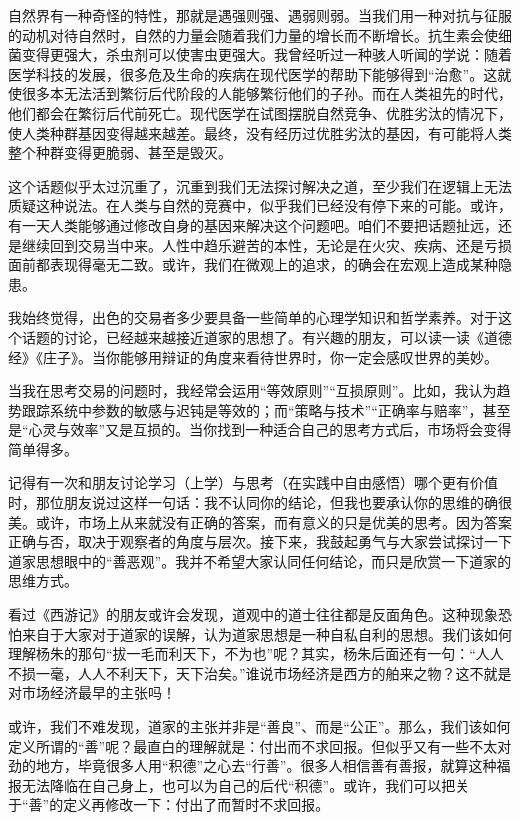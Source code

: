 自然界有一种奇怪的特性，那就是遇强则强、遇弱则弱。当我们用一种对抗与征服的动机对待自然时，自然的力量会随着我们力量的增长而不断增长。抗生素会使细菌变得更强大，杀虫剂可以使害虫更强大。我曾经听过一种骇人听闻的学说：随着医学科技的发展，很多危及生命的疾病在现代医学的帮助下能够得到“治愈”。这就使很多本无法活到繁衍后代阶段的人能够繁衍他们的子孙。而在人类祖先的时代，他们都会在繁衍后代前死亡。现代医学在试图摆脱自然竞争、优胜劣汰的情况下，使人类种群基因变得越来越差。最终，没有经历过优胜劣汰的基因，有可能将人类整个种群变得更脆弱、甚至是毁灭。

这个话题似乎太过沉重了，沉重到我们无法探讨解决之道，至少我们在逻辑上无法质疑这种说法。在人类与自然的竞赛中，似乎我们已经没有停下来的可能。或许，有一天人类能够通过修改自身的基因来解决这个问题吧。咱们不要把话题扯远，还是继续回到交易当中来。人性中趋乐避苦的本性，无论是在火灾、疾病、还是亏损面前都表现得毫无二致。或许，我们在微观上的追求，的确会在宏观上造成某种隐患。

我始终觉得，出色的交易者多少要具备一些简单的心理学知识和哲学素养。对于这个话题的讨论，已经越来越接近道家的思想了。有兴趣的朋友，可以读一读《道德经》《庄子》。当你能够用辩证的角度来看待世界时，你一定会感叹世界的美妙。

当我在思考交易的问题时，我经常会运用“等效原则”“互损原则”。比如，我认为趋势跟踪系统中参数的敏感与迟钝是等效的；而“策略与技术”“正确率与赔率”，甚至是“心灵与效率”又是互损的。当你找到一种适合自己的思考方式后，市场将会变得简单得多。

记得有一次和朋友讨论学习（上学）与思考（在实践中自由感悟）哪个更有价值时，那位朋友说过这样一句话：我不认同你的结论，但我也要承认你的思维的确很美。或许，市场上从来就没有正确的答案，而有意义的只是优美的思考。因为答案正确与否，取决于观察者的角度与层次。接下来，我鼓起勇气与大家尝试探讨一下道家思想眼中的“善恶观”。我并不希望大家认同任何结论，而只是欣赏一下道家的思维方式。

看过《西游记》的朋友或许会发现，道观中的道士往往都是反面角色。这种现象恐怕来自于大家对于道家的误解，认为道家思想是一种自私自利的思想。我们该如何理解杨朱的那句“拔一毛而利天下，不为也”呢？其实，杨朱后面还有一句：“人人不损一毫，人人不利天下，天下治矣。”谁说市场经济是西方的舶来之物？这不就是对市场经济最早的主张吗！

或许，我们不难发现，道家的主张并非是“善良”、而是“公正”。那么，我们该如何定义所谓的“善”呢？最直白的理解就是：付出而不求回报。但似乎又有一些不太对劲的地方，毕竟很多人用“积德”之心去“行善”。很多人相信善有善报，就算这种福报无法降临在自己身上，也可以为自己的后代“积德”。或许，我们可以把关于“善”的定义再修改一下：付出了而暂时不求回报。

